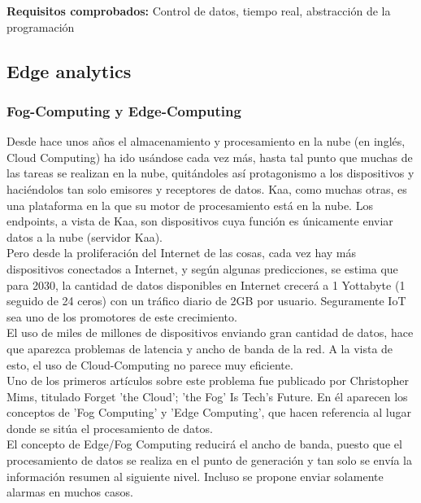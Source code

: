 \documentclass[12pt, twoside]{book}
\begin{document}
\textbf{Requisitos comprobados: } Control de datos, tiempo real, abstracción de la programación
\subsection{Edge analytics}
\subsubsection*{Fog-Computing y Edge-Computing}
Desde hace unos años el almacenamiento y procesamiento en la nube (en inglés, Cloud Computing) ha ido usándose cada vez más, hasta tal punto que muchas de las tareas se realizan en la nube, quitándoles así protagonismo a los dispositivos y haciéndolos tan solo emisores y receptores de datos. Kaa, como muchas otras, es una plataforma en la que su motor de procesamiento está en la nube. Los endpoints, a vista de Kaa, son dispositivos cuya función es únicamente enviar datos a la nube (servidor Kaa). \\
Pero desde la proliferación del Internet de las cosas, cada vez hay más dispositivos conectados a Internet, y según algunas predicciones, se estima que para 2030, la cantidad de datos disponibles en Internet crecerá a 1 Yottabyte (1 seguido de 24 ceros) con un tráfico diario de 2GB por usuario. Seguramente IoT sea uno de los promotores de este crecimiento. \\
El uso de miles de millones de dispositivos enviando gran cantidad de datos, hace que aparezca problemas de latencia y ancho de banda de la red. A la vista de esto, el uso de Cloud-Computing no parece muy eficiente.\\ %
Uno de los primeros artículos sobre este problema fue publicado por Christopher Mims, titulado Forget 'the Cloud'; 'the Fog' Is Tech's Future\cite{wsj}. En él aparecen los conceptos de 'Fog Computing' y 'Edge Computing', que hacen referencia al lugar donde se sitúa el procesamiento de datos.\\
El concepto de Edge/Fog Computing reducirá el ancho de banda, puesto que el procesamiento de datos se realiza en el punto de generación y tan solo se envía la información resumen al siguiente nivel. Incluso se propone enviar solamente alarmas en muchos casos. 
\end{document}
